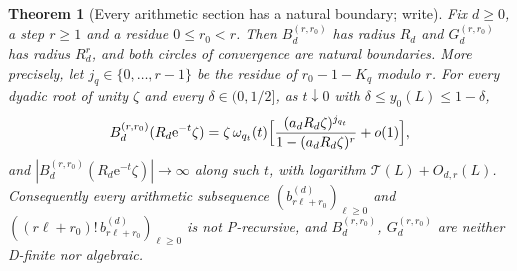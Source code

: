\documentclass[11pt,a4paper]{article}
\newtheorem{theorem}{Theorem}[section]
\theoremstyle{definition}
\newcommand{\e}{\mathrm e}
\begin{document}
\begin{theorem}[Every arithmetic section has a natural boundary; write]
\label{sbd:wr:thm:sections}
Fix $d\ge0$, a step $r\ge1$ and a residue $0\le r_0<r$. Then
$B_d^{(r,r_0)}$ has radius $R_d$ and $G_d^{(r,r_0)}$ has radius $R_d^r$, and
both circles of convergence are natural boundaries. More precisely, let
$j_q\in\{0,\ldots,r-1\}$ be the residue of $r_0-1-K_q$ modulo $r$. For
every dyadic root of unity $\zeta$ and every $\delta\in(0,1/2]$, as
$t\downarrow0$ with $\delta\le y_0(L)\le1-\delta$,
\begin{equation}\label{sbd:wr:eq:sections}
 B_d^{(r,r_0)}(R_d\e^{-t}\zeta)
 =\zeta\,\omega_{q_t}(t)\Bigl[\frac{(a_dR_d\zeta)^{j_{q_t}}}{1-(a_dR_d\zeta)^r}
 +o(1)\Bigr],
\end{equation}
and $|B_d^{(r,r_0)}(R_d\e^{-t}\zeta)|\to\infty$ along such $t$, with
logarithm $\mathcal T(L)+O_{d,r}(L)$. Consequently every arithmetic
subsequence $(b_{r\ell+r_0}^{(d)})_{\ell\ge0}$ and
$((r\ell+r_0)!\,b_{r\ell+r_0}^{(d)})_{\ell\ge0}$ is not P-recursive, and
$B_d^{(r,r_0)}$, $G_d^{(r,r_0)}$ are neither D-finite nor algebraic.
\end{theorem}
\end{document}
